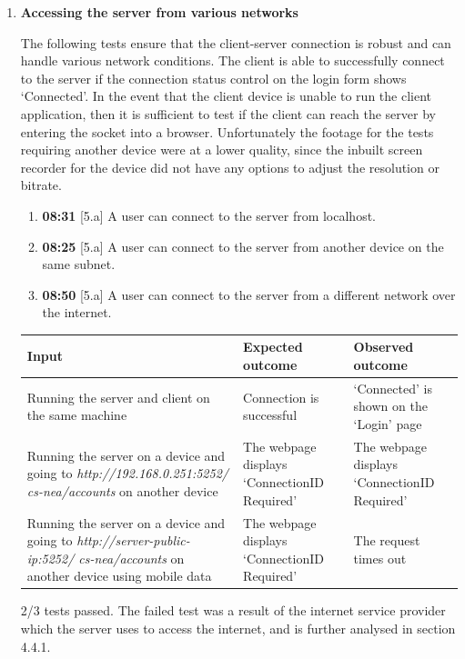 \documentclass{article}
\begin{document}
\begin{enumerate}
    \item \textbf{Accessing the server from various networks}
    
    The following tests ensure that the client-server connection is robust and can handle various network conditions. The client is able to successfully connect to the server if the connection status control on the login form shows `Connected'. In the event that the client device is unable to run the client application, then it is sufficient to test if the client can reach the server by entering the socket into a browser. Unfortunately the footage for the tests requiring another device were at a lower quality, since the inbuilt screen recorder for the device did not have any options to adjust the resolution or bitrate. \\

    \begin{enumerate}
        \item \textbf{08:31} [5.a] A user can connect to the server from localhost.
        \item \textbf{08:25} [5.a] A user can connect to the server from another device on the same subnet.\@
        \item \textbf{08:50} [5.a] A user can connect to the server from a different network over the internet.
    \end{enumerate}

    \begin{table}[H]
    \centering
        \begin{tabularx}{\textwidth}{|L|L|L|}
        \hline
        \textbf{Input} & \textbf{Expected outcome} & \textbf{Observed outcome} \\\hline
        Running the server and client on the same machine & Connection is successful & `Connected' is shown on the `Login' page \\\hline
        Running the server on a device and going to \textit{http://192.168.0.251:5252/ cs-nea/accounts} on another device & The webpage displays `ConnectionID Required' & The webpage displays `ConnectionID Required' \\\hline
        Running the server on a device and going to \textit{http://server-public-ip:5252/ cs-nea/accounts} on another device using mobile data & The webpage displays `ConnectionID Required' & The request times out \\\hline
        \end{tabularx}
    \end{table}

    2/3 tests passed. The failed test was a result of the internet service provider which the server uses to access the internet, and is further analysed in section 4.4.1. \\

\end{enumerate}
\end{document}
